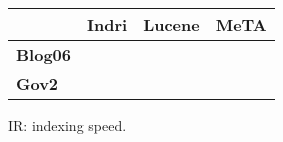 \begin{figure}[t]
\centering
{\small
\begin{tabular}{|l|r|r|r|}
        \hline & \textbf{Indri} & \textbf{Lucene} & \textbf{MeTA} \\
        \hline
        \textbf{Blog06} & & & \\
        \textbf{Gov2}    & & & \\
        \hline
\end{tabular}
\caption{IR: indexing speed.}
}
\label{fig:ir-indexing}
\end{figure}
